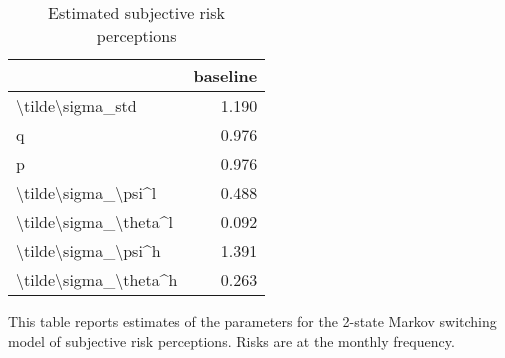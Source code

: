 
\begin{table}[p]
\centering
\begin{adjustbox}{width=0.3\textwidth}
\begin{threeparttable}
\caption{Estimated subjective risk perceptions}
\label{tab:PRMarkovEst}\begin{tabular}{lr}
\toprule
{} &  baseline \\
\midrule
\textbackslash tilde\textbackslash sigma\_std      &     1.190 \\
q                     &     0.976 \\
p                     &     0.976 \\
\textbackslash tilde\textbackslash sigma\_\textbackslash psi\textasciicircum l   &     0.488 \\
\textbackslash tilde\textbackslash sigma\_\textbackslash theta\textasciicircum l &     0.092 \\
\textbackslash tilde\textbackslash sigma\_\textbackslash psi\textasciicircum h   &     1.391 \\
\textbackslash tilde\textbackslash sigma\_\textbackslash theta\textasciicircum h &     0.263 \\
\bottomrule
\end{tabular}
\begin{tablenotes}\item This table reports estimates of the parameters 
for the 2-state Markov switching model of subjective risk perceptions. Risks are at the monthly frequency. 
\end{tablenotes}
\end{threeparttable}
\end{adjustbox}
\end{table}